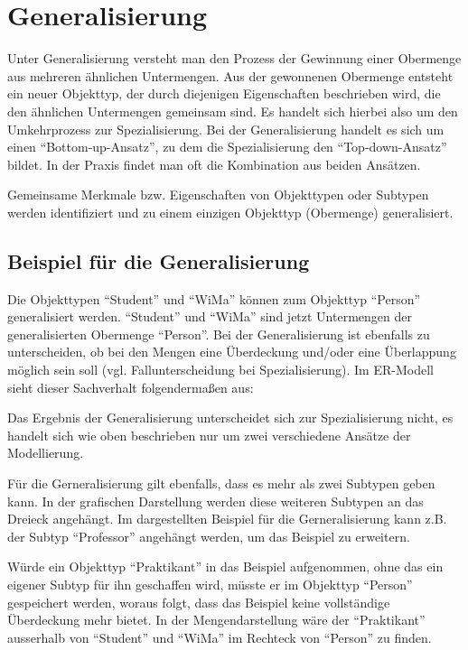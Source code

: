      \section{Generalisierung}
      Unter Generalisierung versteht man den Prozess der Gewinnung einer Obermenge aus mehreren \"ahnlichen Untermengen. Aus der gewonnenen Obermenge entsteht ein neuer Objekttyp, der durch diejenigen Eigenschaften beschrieben wird, die den \"ahnlichen Untermengen gemeinsam sind. Es handelt sich hierbei also um den Umkehrprozess zur Spezialisierung. Bei der Generalisierung handelt es sich um einen \enquote{Bottom-up-Ansatz}, zu dem die Spezialisierung den \enquote{Top-down-Ansatz} bildet. In der Praxis findet man oft die Kombination aus beiden Ans\"atzen.

      Gemeinsame Merkmale bzw. Eigenschaften von Objekttypen oder Subtypen werden identifiziert und zu einem einzigen Objekttyp (Obermenge) generalisiert.
      \subsection{Beispiel f\"ur die Generalisierung}
        Die Objekttypen \enquote{Student} und \enquote{WiMa} k\"onnen zum Objekttyp \enquote{Person} generalisiert werden. \enquote{Student} und \enquote{WiMa} sind jetzt Untermengen der generalisierten Obermenge \enquote{Person}. Bei der Generalisierung ist ebenfalls zu unterscheiden, ob bei den Mengen eine \"Uberdeckung und/oder eine \"Uberlappung m\"oglich sein soll (vgl. Fallunterscheidung bei Spezialisierung). Im ER-Modell sieht dieser Sachverhalt folgenderma\ss en aus:
        \begin{center}
        \end{center}
        Das Ergebnis der Generalisierung unterscheidet sich zur Spezialisierung nicht, es handelt sich wie oben beschrieben nur um zwei verschiedene Ans\"atze der Modellierung.

        F\"ur die Gerneralisierung gilt ebenfalls, dass es mehr als zwei Subtypen geben kann. In der grafischen Darstellung werden diese weiteren Subtypen an das Dreieck angeh\"angt. Im dargestellten Beispiel f\"ur die Gerneralisierung kann z.B. der Subtyp \enquote{Professor} angeh\"angt werden, um das Beispiel zu erweitern.

        W\"urde ein Objekttyp \enquote{Praktikant} in das Beispiel aufgenommen, ohne das ein eigener Subtyp f\"ur ihn geschaffen wird, m\"usste er im Objekttyp \enquote{Person} gespeichert werden, woraus folgt, dass das Beispiel keine vollst\"andige \"Uberdeckung mehr bietet. In der Mengendarstellung w\"are der \enquote{Praktikant} ausserhalb von \enquote{Student} und \enquote{WiMa} im Rechteck von \enquote{Person} zu finden.
\clearpage
